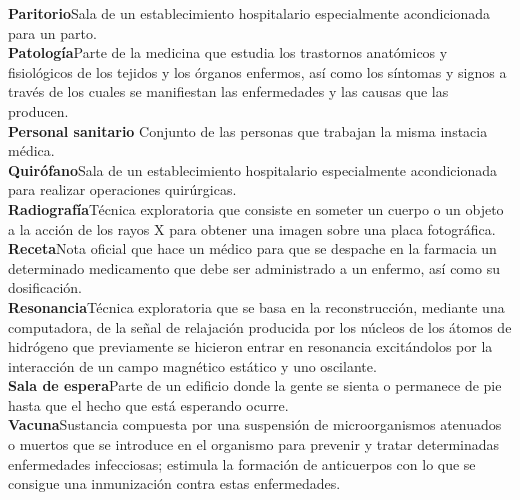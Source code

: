 \documentclass[11pt,a4paper]{article}
\newcommand{\term}[2]{\textbf{#1}\quad#2\\}
\begin{document}
	\term{Paritorio}{Sala de un establecimiento hospitalario especialmente acondicionada para un parto.}
	\term{Patología}{Parte de la medicina que estudia los trastornos anatómicos y fisiológicos de los tejidos y los órganos enfermos, así como los síntomas y signos a través de los cuales se manifiestan las enfermedades y las causas que las producen.}
	\term{Personal sanitario }{Conjunto de las personas que trabajan la misma instacia médica.}
	\term{Quirófano}{Sala de un establecimiento hospitalario especialmente acondicionada para realizar operaciones quirúrgicas.}
	\term{Radiografía}{Técnica exploratoria que consiste en someter un cuerpo o un objeto a la acción de los rayos X para obtener una imagen sobre una placa fotográfica.}
	\term{Receta}{Nota oficial que hace un médico para que se despache en la farmacia un determinado medicamento que debe ser administrado a un enfermo, así como su dosificación.}
	\term{Resonancia}{Técnica exploratoria que se basa en la reconstrucción, mediante una computadora, de la señal de relajación producida por los núcleos de los átomos de hidrógeno que previamente se hicieron entrar en resonancia excitándolos por la interacción de un campo magnético estático y uno oscilante.}
	\term{Sala de espera}{Parte de un edificio donde la gente se sienta o permanece de pie hasta que el hecho que está esperando ocurre.}
	\term{Vacuna}{Sustancia compuesta por una suspensión de microorganismos atenuados o muertos que se introduce en el organismo para prevenir y tratar determinadas enfermedades infecciosas; estimula la formación de anticuerpos con lo que se consigue una inmunización contra estas enfermedades.}


	
\end{document}
